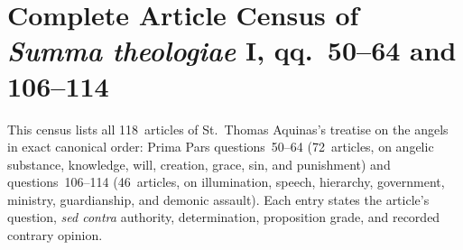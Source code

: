 \section{Complete Article Census of \emph{Summa theologiae} I, qq.~50--64 and 106--114}
\label{app:article-census}

This census lists all 118~articles of St.~Thomas Aquinas's treatise on the angels in exact canonical order: Prima Pars questions~50--64 (72~articles, on angelic substance, knowledge, will, creation, grace, sin, and punishment) and questions~106--114 (46~articles, on illumination, speech, hierarchy, government, ministry, guardianship, and demonic assault). Each entry states the article's question, \emph{sed contra} authority, determination, proposition grade, and recorded contrary opinion.

